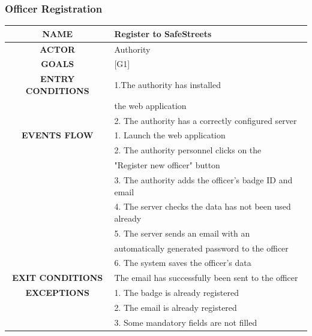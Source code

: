 \documentclass[12pt,a4paper]{article}
\begin{document}
\subsubsection{Officer Registration}
		\begin{center}
			\begin{tabular}{| c | l |}
				\hline
				\textbf{NAME} & Register to SafeStreets \\
				\hline
				\textbf{ACTOR} & Authority \\
				\hline
				\textbf{GOALS} & [G1] \\
				\hline
				\textbf{ENTRY CONDITIONS} &1.The authority has installed \\
				&	the web application \\
				&2. The authority has a correctly configured server \\ \hline
				\textbf{EVENTS FLOW}  &
				1. Launch the web application\\
				&2. The authority personnel clicks on the \\
				& "Register new officer" button \\
				&3. The authority adds the officer's badge ID and email\\
				&4. The server checks the data has not been used already \\
				&5. The server sends an email with an \\
				& automatically generated password to the officer\\
				&6. The system saves the officer's data\\
				\hline
				\textbf{EXIT CONDITIONS}  & The email has successfully been sent to the officer\\ \hline
				\textbf{EXCEPTIONS} &
				1. The badge is already registered\\
				&2. The email is already registered\\
				&3. Some mandatory fields are not filled\\
				\hline
			\end{tabular}
		\end{center}
\newpage
\end{document}
